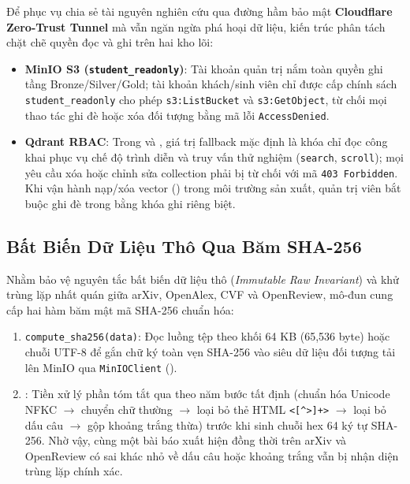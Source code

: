 Để phục vụ chia sẻ tài nguyên nghiên cứu qua đường hầm bảo mật \textbf{Cloudflare Zero-Trust Tunnel} mà vẫn ngăn ngừa phá hoại dữ liệu, kiến trúc phân tách chặt chẽ quyền đọc và ghi trên hai kho lõi:
\begin{itemize}
  \item \textbf{MinIO S3 (\texttt{student\_readonly})}: Tài khoản quản trị nắm toàn quyền ghi tầng Bronze/Silver/Gold; tài khoản khách/sinh viên chỉ được cấp chính sách \texttt{student\_readonly} cho phép \texttt{s3:ListBucket} và \texttt{s3:GetObject}, từ chối mọi thao tác ghi đè hoặc xóa đối tượng bằng mã lỗi \texttt{AccessDenied}.
  \item \textbf{Qdrant RBAC}: Trong  và , giá trị fallback mặc định  là khóa chỉ đọc công khai phục vụ chế độ trình diễn và truy vấn thử nghiệm (\texttt{search}, \texttt{scroll}); mọi yêu cầu xóa hoặc chỉnh sửa collection phải bị từ chối với mã \texttt{403 Forbidden}. Khi vận hành nạp/xóa vector () trong môi trường sản xuất, quản trị viên bắt buộc ghi đè  trong  bằng khóa ghi riêng biệt.
\end{itemize}

\subsection{Bất Biến Dữ Liệu Thô Qua Băm SHA-256}
\label{sec:ch6_sha256}

Nhằm bảo vệ nguyên tắc bất biến dữ liệu thô (\textit{Immutable Raw Invariant}) và khử trùng lặp nhất quán giữa arXiv, OpenAlex, CVF và OpenReview, mô-đun  cung cấp hai hàm băm mật mã SHA-256 chuẩn hóa:
\begin{enumerate}[label=\textbf{\arabic*.}]
  \item \texttt{compute\_sha256(data)}: Đọc luồng tệp theo khối 64 KB (65,536 byte) hoặc chuỗi UTF-8 để gắn chữ ký toàn vẹn SHA-256 vào siêu dữ liệu đối tượng tải lên MinIO qua \texttt{MinIOClient} ().
  \item {}: Tiền xử lý phần tóm tắt qua  theo năm bước tất định (chuẩn hóa Unicode NFKC $\rightarrow$ chuyển chữ thường $\rightarrow$ loại bỏ thẻ HTML \texttt{<[\textasciicircum{}>]+>} $\rightarrow$ loại bỏ dấu câu $\rightarrow$ gộp khoảng trắng thừa) trước khi sinh chuỗi hex 64 ký tự SHA-256. Nhờ vậy, cùng một bài báo xuất hiện đồng thời trên arXiv và OpenReview có sai khác nhỏ về dấu câu hoặc khoảng trắng vẫn bị nhận diện trùng lặp chính xác.
\end{enumerate}

